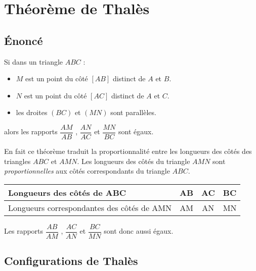 \section{Théorème de Thalès}
    \subsection{Énoncé}
        \begin{theoreme}[\admis]
            Si dans un triangle $ABC$ :
            \begin{itemize}                
                \item $M$ est un point du côté $[AB]$ distinct de $A$ et $B$.
                \item $N$ est un point du côté $[AC]$ distinct de $A$ et $C$.
                \item les droites $(BC)$ et $(MN)$ sont parallèles.       
            \end{itemize}
            \medskip
            alors les rapports $\dfrac{AM}{AB}$ , $\dfrac{AN}{AC}$ et $\dfrac{MN}{BC}$ sont égaux.
        \end{theoreme}

        \begin{remarque}
            En fait ce théorème traduit la proportionnalité entre les longueurs des côtés des triangles $ABC$ et $AMN$.
            Les longueurs des côtés du triangle $AMN$ sont {\em proportionnelles} aux côtés correspondants du triangle $ABC$.

            \medskip
            \begin{tabular}{|p{6cm}|c|c|c|}
            \hline 
            Longueurs des côtés de ABC & AB & AC & BC \\ 
            \hline 
            Longueurs correspondantes des côtés de AMN & AM & AN & MN \\ 
            \hline 
            \end{tabular} 

            \medskip
            Les rapports $\dfrac{AB}{AM}$ , $\dfrac{AC}{AN}$ et $\dfrac{BC}{MN}$ sont donc aussi égaux.
        \end{remarque}
    
    \subsection{Configurations de Thalès}
         \color{black}{\dashuline{\color{black}{Les droites en pointillés noirs sont parallèles.}}}
        \color{black}

